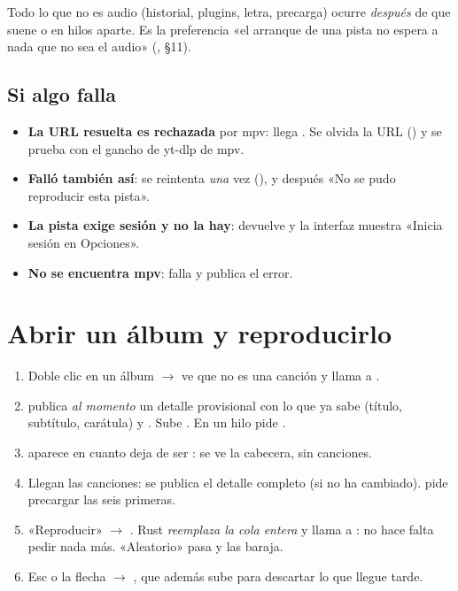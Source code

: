 Todo lo que no es audio (historial, plugins, letra, precarga) ocurre \emph{después} de que
suene o en hilos aparte. Es la preferencia «el arranque de una pista no espera a nada que no
sea el audio» (, §11).

\subsection{Si algo falla}

\begin{itemize}
  \item \textbf{La URL resuelta es rechazada} por mpv: llega . Se olvida
  la URL () y se prueba con el gancho de yt-dlp de mpv.
  \item \textbf{Falló también así}: se reintenta \emph{una} vez (), y después
  «No se pudo reproducir esta pista».
  \item \textbf{La pista exige sesión y no la hay}:  devuelve 
  y la interfaz muestra «Inicia sesión en Opciones».
  \item \textbf{No se encuentra mpv}:  falla y publica el error.
\end{itemize}

\section{Abrir un álbum y reproducirlo}

\begin{enumerate}
  \item Doble clic en un álbum $\rightarrow$  ve que no es una canción y llama
  a .
  \item \textbf{} publica \emph{al momento} un detalle provisional
  con lo que ya sabe (título, subtítulo, carátula) y . Sube
  . En un hilo pide .
  \item {} aparece en cuanto  deja de ser
  : se ve la cabecera, sin canciones.
  \item Llegan las canciones: se publica el detalle completo (si  no ha
  cambiado).  pide precargar las seis primeras.
  \item «Reproducir» $\rightarrow$ .
  Rust \emph{reemplaza la cola entera} y llama a : no hace falta pedir nada más.
  «Aleatorio» pasa  y  las baraja.
  \item Esc o la flecha $\rightarrow$ , que además sube
   para descartar lo que llegue tarde.
\end{enumerate}

